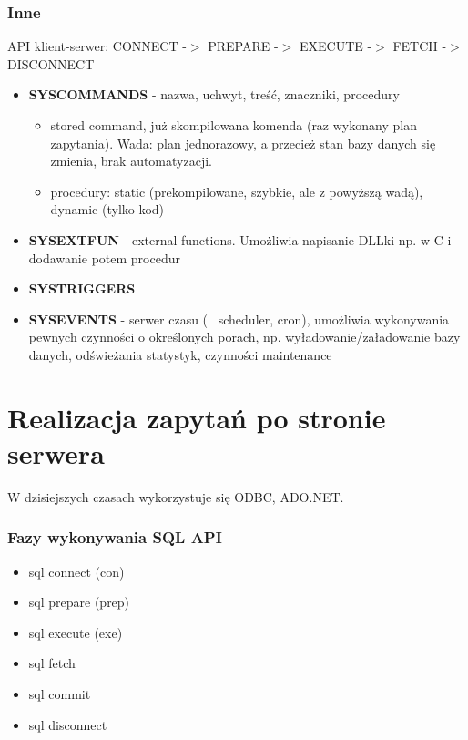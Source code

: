 \documentclass[a4paper,twoside]{article}
\begin{document}
 	\section*{Inne}
  	API klient-serwer: CONNECT -$ > $ PREPARE -$ > $ EXECUTE -$ > $ FETCH -$ > $ DISCONNECT
  	\begin{itemize}
	  	\item \textbf{SYSCOMMANDS} - nazwa, uchwyt, treść, znaczniki, procedury
	  	\begin{itemize}
	  		\item stored command, już skompilowana komenda (raz wykonany plan zapytania). Wada: plan jednorazowy, a przecież stan bazy danych się zmienia, brak automatyzacji.
	  		\item procedury: static (prekompilowane, szybkie, ale z powyższą wadą), dynamic (tylko kod)
	  	\end{itemize}
	  	\item \textbf{SYSEXTFUN} - external functions. Umożliwia napisanie DLLki np. w C i dodawanie potem procedur
	  	\item \textbf{SYSTRIGGERS}
	  	\item \textbf{SYSEVENTS} - serwer czasu (~ scheduler, cron), umożliwia wykonywania pewnych czynności o określonych porach, np. wyładowanie/załadowanie bazy danych, odświeżania statystyk, czynności maintenance
  	\end{itemize}
  	
  	\part*{Realizacja zapytań po stronie serwera}
  	W dzisiejszych czasach wykorzystuje się ODBC, ADO.NET.
  	\section*{Fazy wykonywania SQL API}
  	\begin{itemize}
  		\item sql connect (con)
  		\item sql prepare (prep)
  		\item sql execute (exe)
  		\item sql fetch
  		\item sql commit
  		\item sql disconnect
  	\end{itemize}
  	
\end{document}
